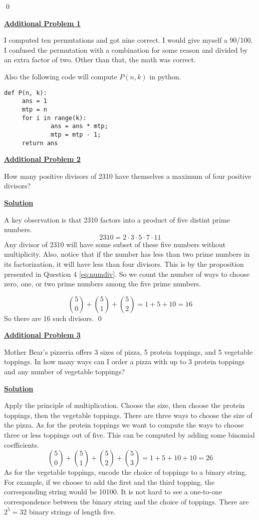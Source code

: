 \documentclass{article}
\newcommand{\new}[1]{
    \vspace{2mm}
    \noindent
    \textbf{
    \underline{#1}}
}
\newcommand{\m}{
    \cdot
}
\begin{document}
\hfill \qed


\new{Additional Problem 1}
I computed ten permutations and got nine correct. I would give 
myself a 90/100. I confused the permutation with a combination for 
some reason and divided by an extra factor of two. Other than that, 
the math was correct. 

Also the following code will compute $P(n, k)$ in python. 
\begin{verbatim}
def P(n, k):
     ans = 1
     mtp = n
     for i in range(k):
             ans = ans * mtp;
             mtp = mtp - 1;
     return ans
\end{verbatim}


\new{Additional Problem 2}
How many positive divisors of 2310 have themselves a maximum of 
four positive divisors?

\new{Solution}
A key observation is that 2310 factors into a product of five distint 
prime numbers. 
\[
    2310 = 2\m3\m5\m7\m11 
\]
Any divisor of 2310 will have some subset of these five numbers 
without multiplicity. Also, notice that if the number has less than 
two prime numbers in its factorization, it will have less than 
four divisors. This is by the proposition presented in Question 4
\eqref{eq:numdiv}. So we count the number of ways to choose zero, one, 
or two prime numbers among the five prime numbers. 

\[
    \binom{5}{0} + \binom{5}{1}
    + \binom{5}{2} = 1 + 5 + 10 = \boxed{16}
\]
So there are 16 such divisors. \hfill \qed

\new{Additional Problem 3}
Mother Bear’s pizzeria offers 3 sizes of pizza,
5 protein toppings, and 5 vegetable toppings. In how many ways can I
order a pizza with up to 3 protein toppings and any number of vegetable
toppings?

\new{Solution}
Apply the principle of multiplication. Choose the size, 
then choose the protein toppings, then the vegetable toppings. 
There are three ways to choose the size of the pizza. As for 
the protein toppings we want to compute the ways to choose three 
or less toppings out of five. This can be computed by adding some 
binomial coefficients. 
\[
    \binom{5}{0} + \binom{5}{1} + \binom{5}{2} + \binom{5}{3} = 
    1 + 5 + 10 + 10 = 26
\]
As for the vegetable toppings, encode the choice of toppings to 
a binary string. For example, if we choose to add the first and 
the third topping, the corresponding string would be 10100. It is 
not hard to see a one-to-one correspondence between the binary 
string and the choice of toppings. There are $2^5 = 32$ binary 
strings of length five. 
\end{document}
